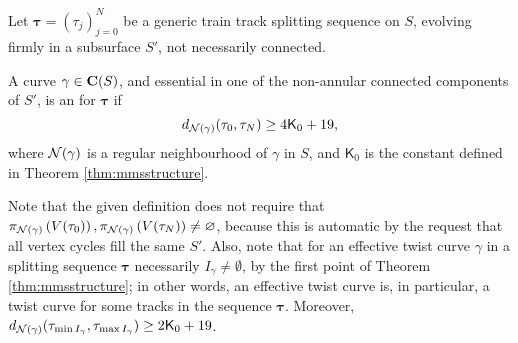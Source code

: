 


\begin{defin}\label{def:etc}
Let $\bm\tau=(\tau_j)_{j=0}^N$ be a generic train track splitting sequence on $S$, evolving firmly in a subsurface $S'$, not necessarily connected.

A curve $\gamma\in\mathbf C(S)$, and essential in one of the non-annular connected components of $S'$, is an  for $\bm\tau$ if 
$$d_{{\mathcal N}(\gamma)}(\tau_0,\tau_N)\geq 4\mathsf{K}_0+ 19,$$
where ${\mathcal N}(\gamma)$ is a regular neighbourhood of $\gamma$ in $S$, and $\mathsf{K}_0$ is the constant defined in Theorem \ref{thm:mmsstructure}.
\end{defin}

Note that the given definition does not require that $\pi_{{\mathcal N}(\gamma)}\left(V(\tau_0)\right), \pi_{{\mathcal N}(\gamma)}\left(V(\tau_N)\right)\not=\varnothing$, because this is automatic by the request that all vertex cycles fill the same $S'$. Also, note that for an effective twist curve $\gamma$ in a splitting sequence $\bm\tau$ necessarily $I_\gamma\not=\emptyset$, by the first point of Theorem \ref{thm:mmsstructure}; in other words, an effective twist curve is, in particular, a twist curve for some tracks in the sequence $\bm\tau$. Moreover, $d_{{\mathcal N}(\gamma)}(\tau_{\min I_\gamma},\tau_{\max I_\gamma})\geq 2\mathsf{K}_0+ 19$.

